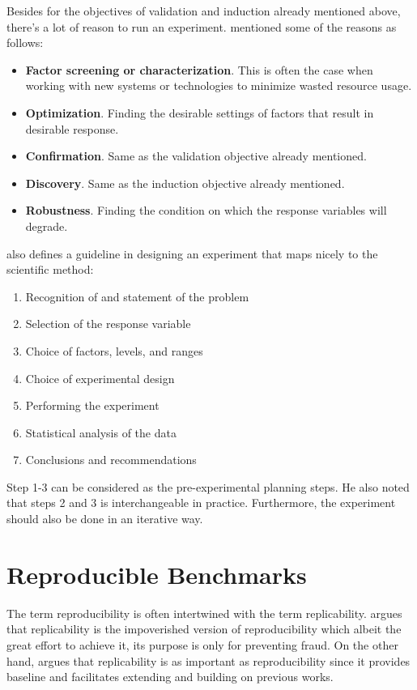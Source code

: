 Besides for the objectives of validation and induction already mentioned above, there's a lot of reason to run an experiment.
\citet{montgomeryDesignAnalysisExperiments2013} mentioned some of the reasons as follows:
\begin {itemize}[noitemsep]
	\item \textbf{Factor screening or characterization}. This is often the case when working with new systems or technologies to minimize wasted resource usage.
	\item \textbf{Optimization}. Finding the desirable settings of factors that result in desirable response.
	\item \textbf{Confirmation}. Same as the validation objective already mentioned.
	\item \textbf{Discovery}. Same as the induction objective already mentioned.
	\item \textbf{Robustness}. Finding the condition on which the response variables will degrade.
\end{itemize}

\citet{montgomeryDesignAnalysisExperiments2013} also defines a guideline in designing an experiment that maps nicely to the scientific method:

\begin{enumerate}[noitemsep]
	\item Recognition of and statement of the problem
	\item Selection of the response variable
	\item Choice of factors, levels, and ranges
	\item Choice of experimental design
	\item Performing the experiment
	\item Statistical analysis of the data
	\item Conclusions and recommendations
\end{enumerate}

Step 1-3 can be considered as the pre-experimental planning steps.
He also noted that steps 2 and 3 is interchangeable in practice.
Furthermore, the experiment should also be done in an iterative way.


\section{Reproducible Benchmarks}
\label{sec:reproducibleBenchmarks}

The term reproducibility is often intertwined with the term replicability.
\citet{drummondReplicabilityNotReproducibility2009} argues that replicability is the impoverished version of reproducibility which albeit the great effort to achieve it, its purpose is only for preventing fraud.
On the other hand, \citet{vitekR3RepeatabilityReproducibility2012} argues that replicability is as important as reproducibility since it provides baseline and facilitates extending and building on previous works.

